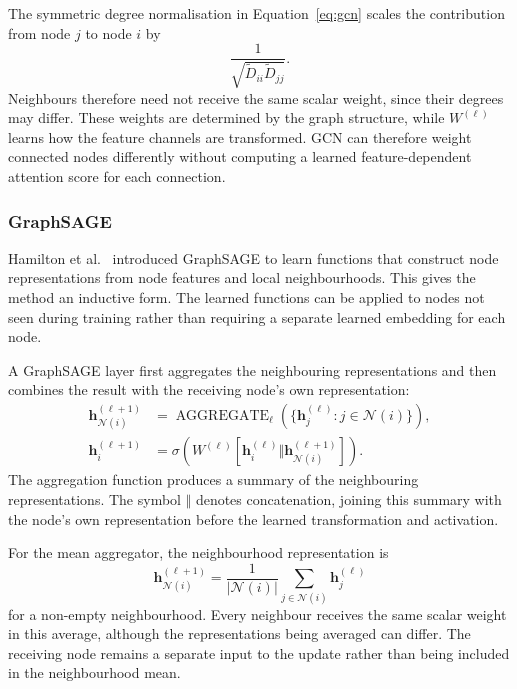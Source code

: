 \documentclass[11pt,a4paper]{article}
\begin{document}
The symmetric degree normalisation in Equation~\eqref{eq:gcn} scales the contribution from node \(j\) to node \(i\) by
\[
\frac{1}{\sqrt{\widetilde{D}_{ii}\widetilde{D}_{jj}}}.
\]
Neighbours therefore need not receive the same scalar weight, since their degrees may differ. These weights are determined by the graph structure, while \(W^{(\ell)}\) learns how the feature channels are transformed. GCN can therefore weight connected nodes differently without computing a learned feature-dependent attention score for each connection.

\subsubsection{GraphSAGE}
\label{sec:graphsage}

Hamilton et al.~\cite{hamilton2017inductive} introduced GraphSAGE to learn functions that construct node representations from node features and local neighbourhoods. This gives the method an inductive form. The learned functions can be applied to nodes not seen during training rather than requiring a separate learned embedding for each node.

A GraphSAGE layer first aggregates the neighbouring representations and then combines the result with the receiving node's own representation:
\begin{equation}
\begin{aligned}
\mathbf{h}_{\mathcal{N}(i)}^{(\ell+1)}
&=
\operatorname{AGGREGATE}_{\ell}
\!\left(
\{\mathbf{h}_j^{(\ell)}:j\in\mathcal{N}(i)\}
\right),\\
\mathbf{h}_i^{(\ell+1)}
&=
\sigma\!\left(
W^{(\ell)}
\left[
\mathbf{h}_i^{(\ell)}
\Vert
\mathbf{h}_{\mathcal{N}(i)}^{(\ell+1)}
\right]
\right).
\end{aligned}
\label{eq:sage-combine}
\end{equation}
The aggregation function produces a summary of the neighbouring representations. The symbol \(\Vert\) denotes concatenation, joining this summary with the node's own representation before the learned transformation and activation.

For the mean aggregator, the neighbourhood representation is
\[
\mathbf{h}_{\mathcal{N}(i)}^{(\ell+1)}
=
\frac{1}{|\mathcal{N}(i)|}
\sum_{j\in\mathcal{N}(i)}
\mathbf{h}_j^{(\ell)}
\]
for a non-empty neighbourhood. Every neighbour receives the same scalar weight in this average, although the representations being averaged can differ. The receiving node remains a separate input to the update rather than being included in the neighbourhood mean.
\end{document}
